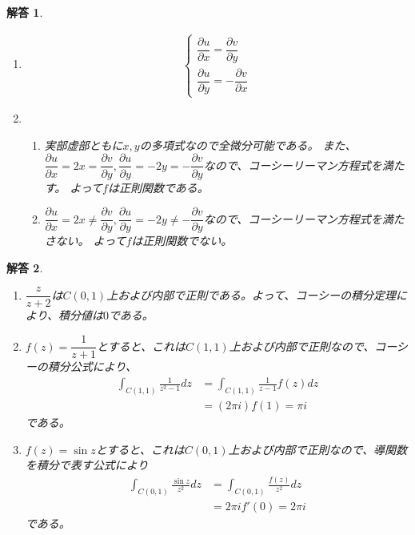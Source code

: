 \documentclass{ltjsarticle}
\newtheorem{ans}{解答}
\begin{document}
\newpage
\begin{ans}
    \begin{enumerate}
        \item 
        \begin{align*}
            \begin{cases}
                \dfrac{\partial u}{\partial x}=\dfrac{\partial v}{\partial y}\\
                \dfrac{\partial u}{\partial y}=-\dfrac{\partial v}{\partial x}
            \end{cases}
        \end{align*}
        \item 
        \begin{enumerate}
            \item 実部虚部ともに$x, y$の多項式なので全微分可能である。
            また、$\dfrac{\partial u}{\partial x}=2x=\dfrac{\partial v}{\partial y},
            \dfrac{\partial u}{\partial y}=-2y=-\dfrac{\partial v}{\partial y}$なので、コーシーリーマン方程式を満たす。
            よって$f$は正則関数である。
            \item $\dfrac{\partial u}{\partial x}=2x\neq\dfrac{\partial v}{\partial y},
            \dfrac{\partial u}{\partial y}=-2y\neq-\dfrac{\partial v}{\partial y}$なので、コーシーリーマン方程式を満たさない。
            よって$f$は正則関数でない。
        \end{enumerate}
    \end{enumerate}
\end{ans}

\begin{ans}
    \begin{enumerate}
        \item $\dfrac{z}{z+2}$は$C(0,1)$上および内部で正則である。よって、コーシーの積分定理により、積分値は$0$である。
        \item $f(z)=\dfrac{1}{z+1}$とすると、これは$C(1,1)$上および内部で正則なので、コーシーの積分公式により、
            \begin{align*}
                \int_{C(1,1)}\frac{1}{z^2-1}dz&=\int_{C(1,1)}\frac{1}{z-1}f(z)dz\\
                &=(2\pi i)f(1)=\pi i
            \end{align*}
            である。
        \item $f(z)=\sin z$とすると、これは$C(0,1)$上および内部で正則なので、導関数を積分で表す公式により
            \begin{align*}
                \int_{C(0,1)}\frac{\sin z}{z^2}dz&=\int_{C(0,1)}\frac{f(z)}{z^2}dz\\
                &=2\pi if'(0)=2\pi i
            \end{align*}
            である。
    \end{enumerate}
\end{ans}
\end{document}
